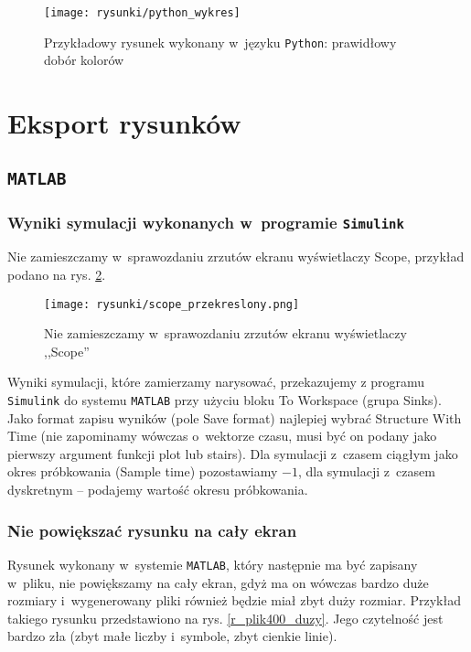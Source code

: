 \begin{figure}[H]
\centering
\texttt{[image: rysunki/python\_wykres]}
\caption{Przykładowy rysunek wykonany w~języku \texttt{Python}: prawidłowy dobór kolorów}
\label{r_wykres_python}
\end{figure}

\section{Eksport rysunków}
\subsection{\texttt{MATLAB}}
\subsubsection{Wyniki symulacji wykonanych w~programie \texttt{Simulink}}
Nie zamieszczamy w~sprawozdaniu zrzutów ekranu wyświetlaczy Scope, przykład podano na rys. \ref{r_scope_przekreslony}.

\begin{figure}[H]
\centering
\texttt{[image: rysunki/scope\_przekreslony.png]}
\caption{Nie zamieszczamy w~sprawozdaniu zrzutów ekranu wyświetlaczy ,,Scope''}
\label{r_scope_przekreslony}
\end{figure}

Wyniki symulacji, które zamierzamy narysować, przekazujemy z programu \texttt{Simulink} do systemu \texttt{MATLAB} przy użyciu bloku To Workspace (grupa Sinks). Jako format zapisu wyników (pole Save format) najlepiej wybrać Structure With Time (nie zapominamy wówczas o~wektorze czasu, musi być on podany jako pierwszy argument funkcji plot lub stairs). Dla symulacji z~czasem ciągłym jako okres próbkowania (Sample time) pozostawiamy $-1$, dla symulacji z~czasem dyskretnym -- podajemy wartość okresu próbkowania.

\subsubsection{Nie powiększać rysunku na cały ekran}
Rysunek wykonany w~systemie \texttt{MATLAB}, który następnie ma być zapisany w~pliku, nie powiększamy na cały ekran, gdyż ma on wówczas bardzo duże rozmiary i~wygenerowany pliki również będzie miał zbyt duży rozmiar. Przykład takiego rysunku przedstawiono na rys. \ref{r_plik400_duzy}. Jego czytelność jest bardzo zła (zbyt małe liczby i~symbole, zbyt cienkie linie).

